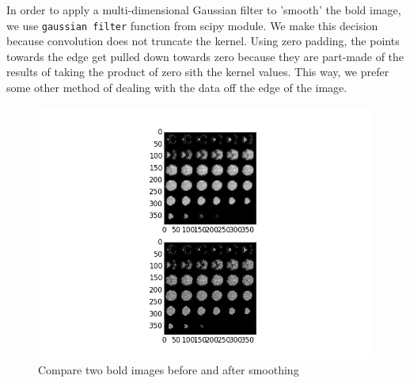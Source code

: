 \par \indent In order to apply a multi-dimensional Gaussian filter to 'smooth'
the bold image, we use \texttt{gaussian filter} function from scipy module. 
We make this decision because convolution does not truncate the kernel. Using
zero padding, the points towards the edge get pulled down towards zero because
they are part-made of the results of taking the product of zero sith the kernel
values. This way, we prefer some other method of dealing with the data off the
edge of the image. 
\begin{figure}[ht]
\centering
\includegraphics[scale=0.5]{images/smooth_fig.png}
\caption{Compare two bold images before and after smoothing}
\label{fig:smoothing}
\end{figure}

